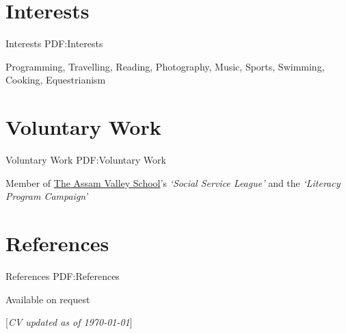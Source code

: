 \documentclass[a4paper,10pt,oneside]{article}
\newcommand{\CVNote}{CV updated as of {\today}}
\begin{document}
\begin{body}


\section
{Interests}
{Interests}
{PDF:Interests}

Programming, Travelling, Reading, Photography, Music, Sports, Swimming, Cooking, Equestrianism

\vspace{-5pt}
\hline

\section
{Voluntary Work}
{Voluntary Work}
{PDF:Voluntary Work}

Member of \href{http://www.assamvalleyschool.com}{The Assam Valley School}'s \textit{`Social Service League'} and the \textit{`Literacy Program Campaign'}

\vspace{-5pt}
\hline


\section
{References}
{References}
{PDF:References}

Available on request


%
\begin{flushright}
\scriptsize%
\vspace{-5pt}
[\textit{\CVNote}]%
\hspace{2.0mm}\null
\end{flushright}

\end{body}
\label{LastPage} %
\end{document}
